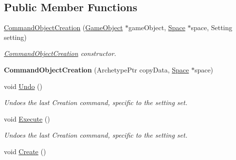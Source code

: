 \subsection*{Public Member Functions}
\begin{DoxyCompactItemize}
\item 
\hypertarget{classDCEngine_1_1CommandObjectCreation_a051a84a121676fbffa9cfb7c24e64713}{\hyperlink{classDCEngine_1_1CommandObjectCreation_a051a84a121676fbffa9cfb7c24e64713}{Command\-Object\-Creation} (\hyperlink{classDCEngine_1_1GameObject}{Game\-Object} $\ast$game\-Object, \hyperlink{classDCEngine_1_1Space}{Space} $\ast$space, Setting setting)}\label{classDCEngine_1_1CommandObjectCreation_a051a84a121676fbffa9cfb7c24e64713}

\begin{DoxyCompactList}\small\item\em \hyperlink{classDCEngine_1_1CommandObjectCreation}{Command\-Object\-Creation} constructor. \end{DoxyCompactList}\item 
\hypertarget{classDCEngine_1_1CommandObjectCreation_a7c015ee6e98f47e5bcb185816d9c66a0}{{\bfseries Command\-Object\-Creation} (Archetype\-Ptr copy\-Data, \hyperlink{classDCEngine_1_1Space}{Space} $\ast$space)}\label{classDCEngine_1_1CommandObjectCreation_a7c015ee6e98f47e5bcb185816d9c66a0}

\item 
\hypertarget{classDCEngine_1_1CommandObjectCreation_af0a957acc7f80c247f26ea8421e5eb2f}{void \hyperlink{classDCEngine_1_1CommandObjectCreation_af0a957acc7f80c247f26ea8421e5eb2f}{Undo} ()}\label{classDCEngine_1_1CommandObjectCreation_af0a957acc7f80c247f26ea8421e5eb2f}

\begin{DoxyCompactList}\small\item\em Undoes the last Creation command, specific to the setting set. \end{DoxyCompactList}\item 
\hypertarget{classDCEngine_1_1CommandObjectCreation_aea823e7c160e8a09fb393459d7e2ff5d}{void \hyperlink{classDCEngine_1_1CommandObjectCreation_aea823e7c160e8a09fb393459d7e2ff5d}{Execute} ()}\label{classDCEngine_1_1CommandObjectCreation_aea823e7c160e8a09fb393459d7e2ff5d}

\begin{DoxyCompactList}\small\item\em Undoes the last Creation command, specific to the setting set. \end{DoxyCompactList}\item 
\hypertarget{classDCEngine_1_1CommandObjectCreation_ad76e4f90f29fe4bef214c624d2775dc9}{void \hyperlink{classDCEngine_1_1CommandObjectCreation_ad76e4f90f29fe4bef214c624d2775dc9}{Create} ()}\label{classDCEngine_1_1CommandObjectCreation_ad76e4f90f29fe4bef214c624d2775dc9}


\end{DoxyCompactItemize}

